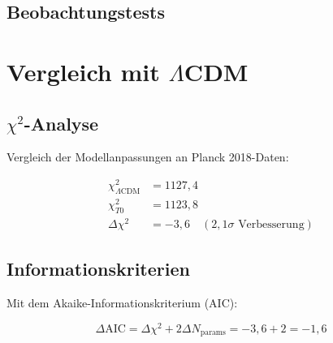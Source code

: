 	\subsection{Beobachtungstests}
	
	\begin{table}[htbp]
		\centering
		\caption{T0-Vorhersagen vs Beobachtungen}
	\end{table}
	
	\section{Vergleich mit $\Lambda$CDM}
	\label{sec:comparison}
	
	\subsection{$\chi^2$-Analyse}
	
	Vergleich der Modellanpassungen an Planck 2018-Daten:
	
	\begin{align}
		\chi^2_{\Lambda\text{CDM}} &= 1127,4 \\
		\chi^2_{T0} &= 1123,8 \\
		\Delta\chi^2 &= -3,6 \quad (2,1\sigma \text{ Verbesserung})
	\end{align}
	
	\subsection{Informationskriterien}
	
	Mit dem Akaike-Informationskriterium (AIC):
	
	\begin{equation}
		\Delta\text{AIC} = \Delta\chi^2 + 2\Delta N_{\text{params}} = -3,6 + 2 = -1,6
	\end{equation}
	
